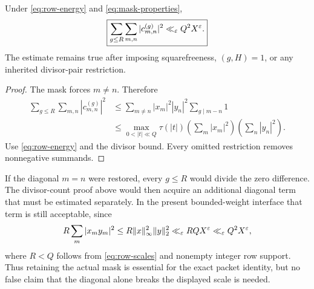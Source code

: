 \begin{proposition}
\label{prop:compatibility-energy}
Under \eqref{eq:row-energy} and \eqref{eq:mask-properties},
\begin{equation}
 \boxed{\sum_{g\le R}\sum_{m,n}|c_{m,n}^{(g)}|^2
 \ll_\varepsilon Q^2X^\varepsilon.}
 \label{eq:compatibility-energy}
\end{equation}
The estimate remains true after imposing squarefreeness,
\((g,H)=1\), or any inherited divisor-pair restriction.
\end{proposition}

\begin{proof}
The mask forces \(m\ne n\).  Therefore
\begin{align*}
 \sum_{g\le R}\sum_{m,n}|c_{m,n}^{(g)}|^2
 &\le\sum_{m\ne n}|x_m|^2|y_n|^2\sum_{g\mid m-n}1\\
 &\le \max_{0<|t|\ll Q}\tau(|t|)
 \left(\sum_m|x_m|^2\right)
 \left(\sum_n|y_n|^2\right).
\end{align*}
Use \eqref{eq:row-energy} and the divisor bound.  Every omitted
restriction removes nonnegative summands.
\end{proof}

If the diagonal \(m=n\) were restored, every \(g\le R\) would divide
the zero difference.  The divisor-count proof above would then acquire
an additional diagonal term that must be estimated separately.  In the
present bounded-weight interface that term is still acceptable, since
\[
 R\sum_m|x_my_m|^2
 \le R\|x\|_\infty^2\|y\|_2^2
 \ll_\varepsilon RQX^\varepsilon
 \ll_\varepsilon Q^2X^\varepsilon,
\]
where \(R<Q\) follows from \eqref{eq:row-scales} and nonempty integer
row support.  Thus retaining the
actual mask is essential for the exact packet identity, but no false
claim that the diagonal alone breaks the displayed scale is needed.
